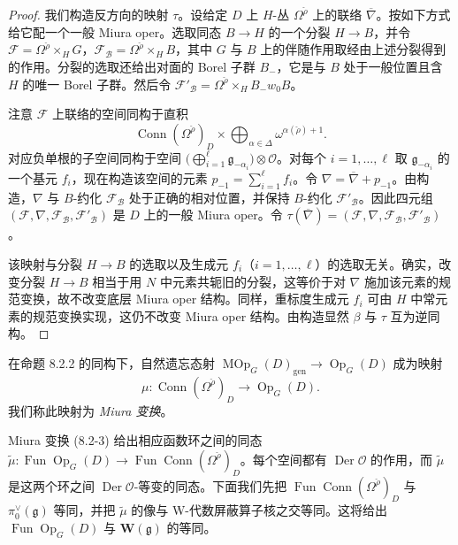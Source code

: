 \begin{proof}
我们构造反方向的映射 $\tau$。设给定 $D$ 上 $H$-丛 $\Omega^{\check\rho}$ 上的联络 $\overline\nabla$。按如下方式给它配一个一般 Miura oper。选取同态 $B\to H$ 的一个分裂 $H\to B$，并令 $\mathcal F=\Omega^{\check\rho}\times_H G$，$\mathcal F_{\mathcal B}=\Omega^{\check\rho}\times_H B$，其中 $G$ 与 $B$ 上的伴随作用取经由上述分裂得到的作用。分裂的选取还给出对面的 Borel 子群 $B_-$，它是与 $B$ 处于一般位置且含 $H$ 的唯一 Borel 子群。然后令 $\mathcal F'_{\mathcal B}=\Omega^{\check\rho}\times_H B_-w_0B$。

注意 $\mathcal F$ 上联络的空间同构于直积
\[
    \operatorname{Conn}(\Omega^{\check\rho})_D\times\bigoplus_{\alpha\in\Delta}\omega^{\alpha(\check\rho)+1}.
\]
对应负单根的子空间同构于空间 $\bigl(\bigoplus_{i=1}^{\ell}\mathfrak g_{-\alpha_i}\bigr)\otimes\mathcal O$。对每个 $i=1,\dots,\ell$ 取 $\mathfrak g_{-\alpha_i}$ 的一个基元 $f_i$，现在构造该空间的元素 $p_{-1}=\sum_{i=1}^{\ell}f_i$。令 $\nabla=\overline\nabla+p_{-1}$。由构造，$\nabla$ 与 $B$-约化 $\mathcal F_{\mathcal B}$ 处于正确的相对位置，并保持 $B$-约化 $\mathcal F'_{\mathcal B}$。因此四元组 $(\mathcal F,\nabla,\mathcal F_{\mathcal B},\mathcal F'_{\mathcal B})$ 是 $D$ 上的一般 Miura oper。令 $\tau(\overline\nabla)=(\mathcal F,\nabla,\mathcal F_{\mathcal B},\mathcal F'_{\mathcal B})$。

该映射与分裂 $H\to B$ 的选取以及生成元 $f_i$（$i=1,\dots,\ell$）的选取无关。确实，改变分裂 $H\to B$ 相当于用 $N$ 中元素共轭旧的分裂，这等价于对 $\nabla$ 施加该元素的规范变换，故不改变底层 Miura oper 结构。同样，重标度生成元 $f_i$ 可由 $H$ 中常元素的规范变换实现，这仍不改变 Miura oper 结构。由构造显然 $\beta$ 与 $\tau$ 互为逆同构。
\end{proof}

在命题 8.2.2 的同构下，自然遗忘态射 $\operatorname{MOp}_G(D)_{\mathrm{gen}}\to\operatorname{Op}_G(D)$ 成为映射
\begin{equation}
    \mu:\operatorname{Conn}(\Omega^{\check\rho})_D\longrightarrow\operatorname{Op}_G(D).
    \tag{8.2-3}
\end{equation}
我们称此映射为 \emph{Miura 变换}。

Miura 变换 (8.2-3) 给出相应函数环之间的同态 $\tilde\mu:\operatorname{Fun}\operatorname{Op}_G(D)\to\operatorname{Fun}\operatorname{Conn}(\Omega^{\check\rho})_D$。每个空间都有 $\operatorname{Der}\mathcal O$ 的作用，而 $\tilde\mu$ 是这两个环之间 $\operatorname{Der}\mathcal O$-等变的同态。下面我们先把 $\operatorname{Fun}\operatorname{Conn}(\Omega^{\check\rho})_D$ 与 $\pi^\vee_0(\mathfrak g)$ 等同，并把 $\tilde\mu$ 的像与 W-代数屏蔽算子核之交等同。这将给出 $\operatorname{Fun}\operatorname{Op}_G(D)$ 与 $\mathbf W(\mathfrak g)$ 的等同。

